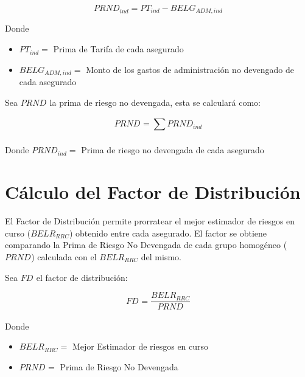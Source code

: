 \documentclass[11pt,twoside,openright,spanish]{report}
\numberwithin{equation}{chapter}
\numberwithin{figure}{chapter}
\numberwithin{table}{chapter}
\begin{document}
	 

\begin{equation}
		{PRND}_{ind}^{}={{PT}_{ind}-BELG_{ADM,ind}}
\label{eq16}
\end{equation}
 
	
	Donde
	
	 
	\begin{itemize}
	\setlength\itemsep{-0.5em}
	\item $PT_{ind}=$ Prima de Tarifa de cada asegurado
	
	\item $BELG_{ADM,ind}=$ Monto de los gastos de administración no devengado de cada asegurado
	\end{itemize}

	
	Sea $PRND_{}$ la prima de riesgo no devengada, esta se calculará como:
	
\begin{equation}
	PRND_{}={\sum _{}^{}PRND_{ind}^{}}
	\label{eq17}
\end{equation}

 
	Donde $PRND_{ind}=$ Prima de riesgo no devengada de cada asegurado
	
	
	
	\section{Cálculo del Factor de Distribución}
	
	 
	
	El Factor de Distribución permite prorratear el mejor estimador de riesgos en curso ($BELR_{RRC}$) obtenido entre cada asegurado. El factor se obtiene comparando la Prima de Riesgo No Devengada de cada grupo homogéneo ($PRND_{}$) calculada con el $BELR_{RRC}$ del mismo.
	
	 
	
	Sea $FD_{}$ el factor de distribución:
	
	 
\begin{equation}
		{FD}_{}^{}=\frac{{BELR}_{RRC}^{}}{{PRND}_{}}
		\label{eq18}
\end{equation}
 
	
	Donde
	
	 
		\begin{itemize}
		\setlength\itemsep{-0.5em}
		\item $BELR_{RRC}=$ Mejor Estimador de riesgos en curso
		
		\item $PRND_{}=$ Prima de Riesgo No Devengada
		
	 	\end{itemize}
\end{document}
